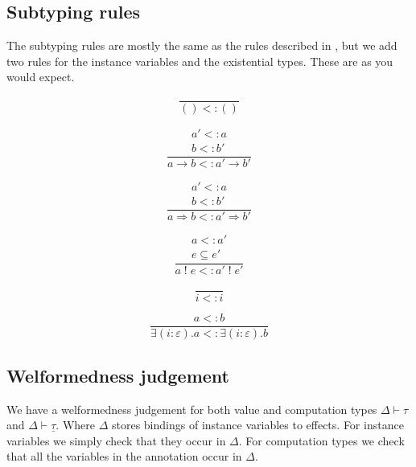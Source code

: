 \documentclass[12pt]{article}
\newcommand\eff[0]{\varepsilon}
\newcommand\ty[0]{\tau}
\newcommand\tunit[0]{()}
\newcommand\tarr[2]{#1 \rightarrow #2}
\newcommand\thandler[2]{#1 \Rightarrow #2}
\newcommand\cty[0]{\underline{\ty}}
\newcommand\aty[2]{#1 \; ! \; #2}
\newcommand\texists[3]{\exists(#1:#2) . #3}
\newcommand\subty[2]{#1 <: #2}
\begin{document}
\newpage
\subsection{Subtyping rules}

The subtyping rules are mostly the same as the rules described in \cite{effectsystem}, but we add two rules for the instance variables and the existential types.
These are as you would expect.

\begin{minipage}{0.5\textwidth}
\[\frac{
}{
	\subty{\tunit}{\tunit}
}\]
\vspace{10pt}
\end{minipage}
\begin{minipage}{0.5\textwidth}
\[\frac{
	\begin{array}{l}
	\subty{a'}{a} \\
	\subty{b}{b'}
	\end{array}
}{
	\subty{\tarr{a}{b}}{\tarr{a'}{b'}}
}\]
\vspace{10pt}
\end{minipage}
\begin{minipage}{0.5\textwidth}
\[\frac{
	\begin{array}{l}
	\subty{a'}{a} \\
	\subty{b}{b'}
	\end{array}
}{
	\subty{\thandler{a}{b}}{\thandler{a'}{b'}}
}\]\vspace{10pt}
\end{minipage}
\begin{minipage}{0.5\textwidth}
\[\frac{
	\begin{array}{l}
	\subty{a}{a'} \\
	e \subseteq e'
	\end{array}
}{
	\subty{\aty{a}{e}}{\aty{a'}{e'}}
}\]\vspace{10pt}
\end{minipage}

\begin{minipage}{0.5\textwidth}
\[\frac{
}{
	\subty{i}{i}
}\]
\end{minipage}
\begin{minipage}{0.5\textwidth}
\[\frac{
	\subty{a}{b}
}{
	\subty{\texists{i}{\eff}{a}}{\texists{i}{\eff}{b}}
}\]
\end{minipage}

\subsection{Welformedness judgement}
We have a welformedness judgement for both value and computation types $\Delta \vdash \ty$ and $\Delta \vdash \cty$.
Where $\Delta$ stores bindings of instance variables to effects.
For instance variables we simply check that they occur in $\Delta$.
For computation types we check that all the variables in the annotation occur in $\Delta$.
\\
\end{document}

